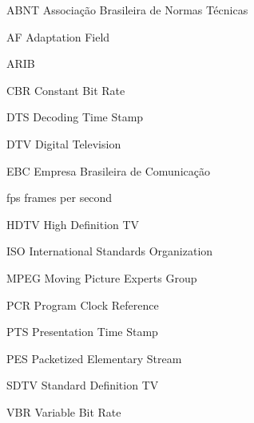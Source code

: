 \begin{siglas}
  \item[ABNT] Associação Brasileira de Normas Técnicas
  \item[AF] Adaptation Field
  \item[ARIB] 
  \item[CBR] Constant Bit Rate
  \item[DTS] Decoding Time Stamp
  \item[DTV] Digital Television
  \item[EBC] Empresa Brasileira de Comunicação
  \item[fps] frames per second
  \item[HDTV] High Definition TV
  \item[ISO] International Standards Organization
  \item[MPEG] Moving Picture Experts Group
  \item[PCR] Program Clock Reference
  \item[PTS] Presentation Time Stamp
  \item[PES] Packetized Elementary Stream
  \item[SDTV] Standard Definition TV
  \item[VBR] Variable Bit Rate
  \item[]
  \item[]
  \item[]
  
  
\end{siglas}